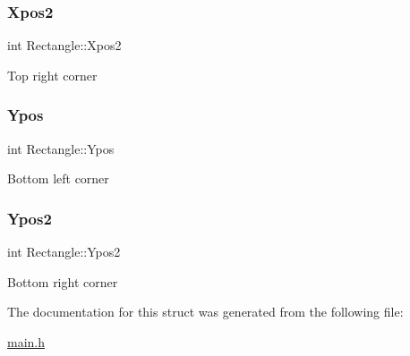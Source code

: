 \subsubsection{\texorpdfstring{Xpos2}{Xpos2}}
{\footnotesize\ttfamily int Rectangle\+::\+Xpos2}

Top right corner \mbox{\label{struct_rectangle_a4ae94fb818ea9b5b459a9ee3e058bc29}} 
\subsubsection{\texorpdfstring{Ypos}{Ypos}}
{\footnotesize\ttfamily int Rectangle\+::\+Ypos}

Bottom left corner \mbox{\label{struct_rectangle_a27c67ab1ffe0dbb8256a649fecb759eb}} 
\subsubsection{\texorpdfstring{Ypos2}{Ypos2}}
{\footnotesize\ttfamily int Rectangle\+::\+Ypos2}

Bottom right corner 

The documentation for this struct was generated from the following file\+:\begin{DoxyCompactItemize}
\item 
\hyperlink{main_8h}{main.\+h}\end{DoxyCompactItemize}
